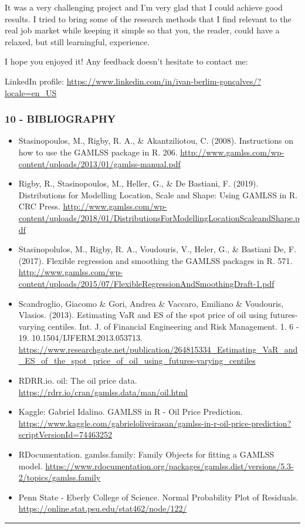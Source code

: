 \documentclass[
]{article}
\begin{document}
It was a very challenging project and I'm very glad that I could achieve
good results. I tried to bring some of the research methods that I find
relevant to the real job market while keeping it simple so that you, the
reader, could have a relaxed, but still learningful, experience.

I hope you enjoyed it! Any feedback doesn't hesitate to contact me:

LinkedIn profile:
\url{https://www.linkedin.com/in/ivan-berlim-gonçalves/?locale=en_US}

\hypertarget{bibliography}{%
\subsubsection{10 - BIBLIOGRAPHY}\label{bibliography}}

\begin{itemize}
\item
  Stasinopoulos, M., Rigby, R. A., \& Akantziliotou, C. (2008).
  Instructions on how to use the GAMLSS package in R. 206.
  \url{http://www.gamlss.com/wp-content/uploads/2013/01/gamlss-manual.pdf}
\item
  Rigby, R., Stasinopoulos, M., Heller, G., \& De Bastiani, F. (2019).
  Distributions for Modelling Location, Scale and Shape: Using GAMLSS in
  R. CRC Press.
  \url{http://www.gamlss.com/wp-content/uploads/2018/01/DistributionsForModellingLocationScaleandShape.pdf}
\item
  Stasinopolulos, M., Rigby, R. A., Voudouris, V., Heler, G., \&
  Bastiani De, F. (2017). Flexible regression and smoothing the GAMLSS
  packages in R. 571.
  \url{http://www.gamlss.com/wp-content/uploads/2015/07/FlexibleRegressionAndSmoothingDraft-1.pdf}
\item
  Scandroglio, Giacomo \& Gori, Andrea \& Vaccaro, Emiliano \&
  Voudouris, Vlasios. (2013). Estimating VaR and ES of the spot price of
  oil using futures-varying centiles. Int. J. of Financial Engineering
  and Risk Management. 1. 6 - 19. 10.1504/IJFERM.2013.053713.
  \url{https://www.researchgate.net/publication/264815334_Estimating_VaR_and_ES_of_the_spot_price_of_oil_using_futures-varying_centiles}
\item
  RDRR.io. oil: The oil price data.
  \url{https://rdrr.io/cran/gamlss.data/man/oil.html}
\item
  Kaggle: Gabriel Idalino. GAMLSS in R - Oil Price Prediction.
  \url{https://www.kaggle.com/gabrieloliveirasan/gamlss-in-r-oil-price-prediction?scriptVersionId=74463252}
\item
  RDocumentation. gamlss.family: Family Objects for fitting a GAMLSS
  model.
  \url{https://www.rdocumentation.org/packages/gamlss.dist/versions/5.3-2/topics/gamlss.family}
\item
  Penn State - Eberly College of Science. Normal Probability Plot of
  Residuals. \url{https://online.stat.psu.edu/stat462/node/122/}
\end{itemize}

\begin{center}\rule{0.5\linewidth}{0.5pt}\end{center}
\end{document}
